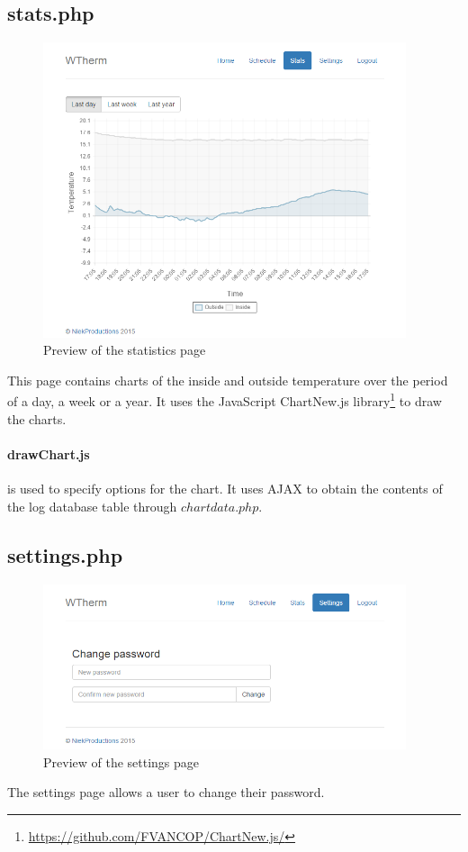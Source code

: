\documentclass[12pt,a4paper,final]{report}
\begin{document}
\subsection*{stats.php}
\begin{figure}[H]
  \begin{center}
      \includegraphics[width=0.95\textwidth]{ui/stats}
  \end{center}
  \caption{Preview of the statistics page}
\end{figure}
This page contains charts of the inside and outside temperature over the period of a day, a week or a year. It uses the JavaScript ChartNew.js library\footnote{\url{https://github.com/FVANCOP/ChartNew.js/}} to draw the charts.

\paragraph{drawChart.js} is used to specify options for the chart. It uses AJAX to obtain the contents of the log database table through $chartdata.php$.

\subsection*{settings.php}
\begin{figure}[H]
  \begin{center}
      \includegraphics[width=0.95\textwidth]{ui/settings}
  \end{center}
  \caption{Preview of the settings page}
\end{figure}
The settings page allows a user to change their password. 
\end{document}
